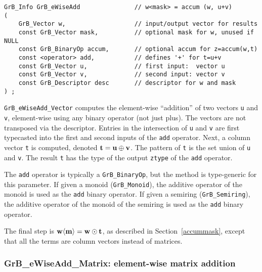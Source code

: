 \documentclass[12pt]{article}
\begin{document}
\begin{mdframed}[userdefinedwidth=6in]
{\footnotesize
\begin{verbatim}
GrB_Info GrB_eWiseAdd               // w<mask> = accum (w, u+v)
(
    GrB_Vector w,                   // input/output vector for results
    const GrB_Vector mask,          // optional mask for w, unused if NULL
    const GrB_BinaryOp accum,       // optional accum for z=accum(w,t)
    const <operator> add,           // defines '+' for t=u+v
    const GrB_Vector u,             // first input:  vector u
    const GrB_Vector v,             // second input: vector v
    const GrB_Descriptor desc       // descriptor for w and mask
) ;
\end{verbatim} } \end{mdframed}

\verb'GrB_eWiseAdd_Vector' computes the element-wise ``addition'' of two
vectors \verb'u' and \verb'v', element-wise using any binary operator (not just
plus).  The vectors are not transposed via the descriptor.  Entries in the
intersection of \verb'u' and \verb'v' are first typecasted into the first and
second inputs of the \verb'add' operator.  Next, a column vector \verb't' is
computed, denoted ${\bf t = u \oplus v}$.  The pattern of \verb't' is the set
union of \verb'u' and \verb'v'.  The result \verb't' has the type of the output
\verb'ztype' of the \verb'add' operator.

The \verb'add' operator is typically a \verb'GrB_BinaryOp', but the method is
type-generic for this parameter.  If given a monoid (\verb'GrB_Monoid'), the
additive operator of the monoid is used as the \verb'add' binary operator.  If
given a semiring (\verb'GrB_Semiring'), the additive operator of the monoid of
the semiring is used as the \verb'add' binary operator.

The final step is ${\bf w \langle m \rangle  = w \odot t}$, as described in
Section~\ref{accummask}, except that all the terms are column vectors instead
of matrices.

\subsubsection{{\sf GrB\_eWiseAdd\_Matrix:} element-wise matrix addition}
\label{eWiseAdd_matrix}
\end{document}
